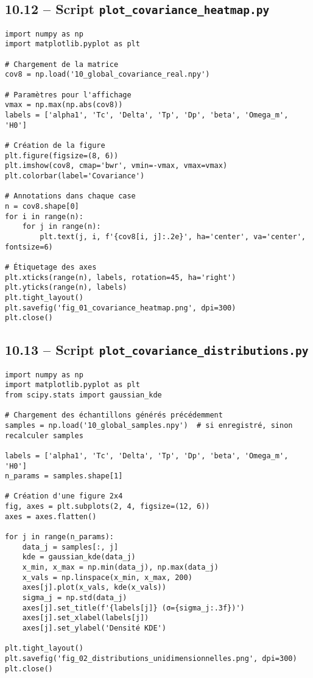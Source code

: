 \subsection{10.12 – Script \texttt{plot\_covariance\_heatmap.py}}
\begin{verbatim}
import numpy as np
import matplotlib.pyplot as plt

# Chargement de la matrice
cov8 = np.load('10_global_covariance_real.npy')

# Paramètres pour l'affichage
vmax = np.max(np.abs(cov8))
labels = ['alpha1', 'Tc', 'Delta', 'Tp', 'Dp', 'beta', 'Omega_m', 'H0']

# Création de la figure
plt.figure(figsize=(8, 6))
plt.imshow(cov8, cmap='bwr', vmin=-vmax, vmax=vmax)
plt.colorbar(label='Covariance')

# Annotations dans chaque case
n = cov8.shape[0]
for i in range(n):
    for j in range(n):
        plt.text(j, i, f'{cov8[i, j]:.2e}', ha='center', va='center', fontsize=6)

# Étiquetage des axes
plt.xticks(range(n), labels, rotation=45, ha='right')
plt.yticks(range(n), labels)
plt.tight_layout()
plt.savefig('fig_01_covariance_heatmap.png', dpi=300)
plt.close()
\end{verbatim}

\subsection{10.13 – Script \texttt{plot\_covariance\_distributions.py}}
\begin{verbatim}
import numpy as np
import matplotlib.pyplot as plt
from scipy.stats import gaussian_kde

# Chargement des échantillons générés précédemment
samples = np.load('10_global_samples.npy')  # si enregistré, sinon recalculer samples

labels = ['alpha1', 'Tc', 'Delta', 'Tp', 'Dp', 'beta', 'Omega_m', 'H0']
n_params = samples.shape[1]

# Création d'une figure 2x4
fig, axes = plt.subplots(2, 4, figsize=(12, 6))
axes = axes.flatten()

for j in range(n_params):
    data_j = samples[:, j]
    kde = gaussian_kde(data_j)
    x_min, x_max = np.min(data_j), np.max(data_j)
    x_vals = np.linspace(x_min, x_max, 200)
    axes[j].plot(x_vals, kde(x_vals))
    sigma_j = np.std(data_j)
    axes[j].set_title(f'{labels[j]} (σ={sigma_j:.3f})')
    axes[j].set_xlabel(labels[j])
    axes[j].set_ylabel('Densité KDE')

plt.tight_layout()
plt.savefig('fig_02_distributions_unidimensionnelles.png', dpi=300)
plt.close()
\end{verbatim}

